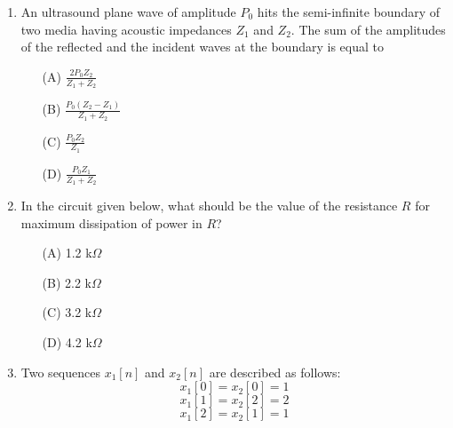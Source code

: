 \documentclass[journal]{IEEEtran}
\begin{document}
\begin{enumerate}
\item  
An ultrasound plane wave of amplitude \( P_0 \) hits the semi-infinite boundary of two media having acoustic impedances \( Z_1 \) and \( Z_2 \). The sum of the amplitudes of the reflected and the incident waves at the boundary is equal to 

\vspace{0.3cm}

\begin{itemize}
    \item[(A)] \( \frac{2 P_0 Z_2}{Z_1 + Z_2} \)
    \item[(B)] \( \frac{P_0 (Z_2 - Z_1)}{Z_1 + Z_2} \)
    \item[(C)] \( \frac{P_0 Z_2}{Z_1} \)
    \item[(D)] \( \frac{P_0 Z_1}{Z_1 + Z_2} \)
\end{itemize}
\hfill{}

\item 
In the circuit given below, what should be the value of the resistance $R$ for maximum dissipation of power in $R$?

\begin{figure}[H]
\centering
{}%

\label{fig:my_label}
\end{figure}

\bigskip

\begin{itemize}
    \item[(A)] 1.2 k$\Omega$
    \item[(B)] 2.2 k$\Omega$
    \item[(C)] 3.2 k$\Omega$
    \item[(D)] 4.2 k$\Omega$
\end{itemize}
\hfill{}

\item 
Two sequences \( x_1[n] \) and \( x_2[n] \) are described as follows:
\[
x_1[0] = x_2[0] = 1
\]
\[
x_1[1] = x_2[2] = 2
\]
\[
x_1[2] = x_2[1] = 1
\]


\end{enumerate}
\end{document}

